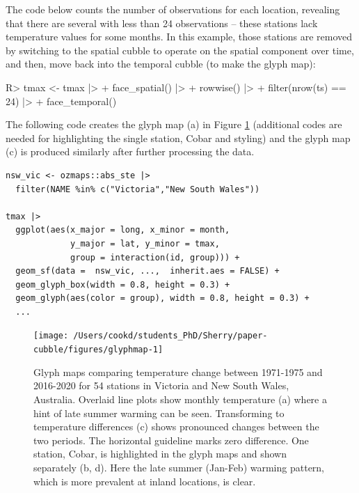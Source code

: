 \documentclass[
  shortnames]{jss}
\begin{document}
The code below counts the number of observations for each location, revealing that there are several with less than 24 observations -- these stations lack temperature values for some months. In this example, those stations are removed by switching to the spatial cubble to operate on the spatial component over time, and then, move back into the temporal cubble (to make the glyph map):

\begin{CodeChunk}
\begin{CodeInput}
R> tmax <- tmax |> 
+   face_spatial() |> 
+   rowwise() |>
+   filter(nrow(ts) == 24) |>
+   face_temporal()
\end{CodeInput}
\end{CodeChunk}

The following code creates the glyph map (a) in Figure \ref{fig:glyphmap} (additional codes are needed for highlighting the single station, Cobar and styling) and the glyph map (c) is produced similarly after further processing the data.

\begin{verbatim}
nsw_vic <- ozmaps::abs_ste |> 
  filter(NAME %in% c("Victoria","New South Wales"))

tmax |> 
  ggplot(aes(x_major = long, x_minor = month, 
             y_major = lat, y_minor = tmax,
             group = interaction(id, group))) + 
  geom_sf(data =  nsw_vic, ...,  inherit.aes = FALSE) + 
  geom_glyph_box(width = 0.8, height = 0.3) + 
  geom_glyph(aes(color = group), width = 0.8, height = 0.3) +
  ...
\end{verbatim}

\begin{CodeChunk}
\begin{figure}

{\centering \texttt{[image: /Users/cookd/students\_PhD/Sherry/paper-cubble/figures/glyphmap-1]} 

}

\caption[Glyph maps comparing temperature change between 1971-1975 and 2016-2020 for 54 stations in Victoria and New South Wales, Australia]{Glyph maps comparing temperature change between 1971-1975 and 2016-2020 for 54 stations in Victoria and New South Wales, Australia. Overlaid line plots show monthly temperature (a) where a hint of late summer warming can be seen. Transforming to temperature differences (c) shows pronounced changes between the two periods. The horizontal guideline marks zero difference. One station, Cobar, is highlighted in the glyph maps and shown separately (b, d). Here the late summer (Jan-Feb) warming pattern, which is more prevalent at inland locations, is clear.}\label{fig:glyphmap}
\end{figure}
\end{CodeChunk}
\end{document}
